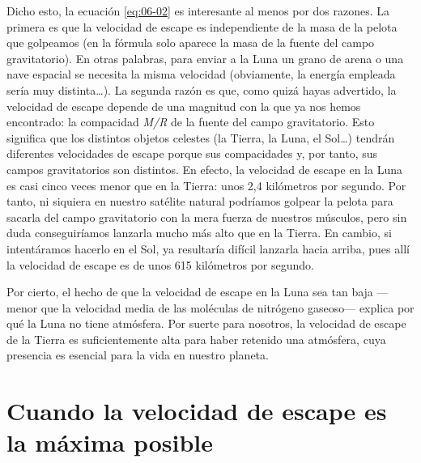Dicho esto, la ecuación \eqref{eq:06-02} es interesante al menos por dos razones. La primera es que la velocidad de escape es independiente de la masa de la pelota que golpeamos (en la fórmula solo aparece la masa de la fuente del campo gravitatorio). En otras palabras, para enviar a la Luna un grano de arena o una nave espacial se necesita la misma velocidad (obviamente, la energía empleada sería muy distinta…). La segunda razón es que, como quizá hayas advertido, la velocidad de escape depende de una magnitud con la que ya nos hemos encontrado: la compacidad \emph{M/R} de la fuente del campo gravitatorio. Esto significa que los distintos objetos celestes (la Tierra, la Luna, el Sol…) tendrán diferentes velocidades de escape porque sus compacidades y, por tanto, sus campos gravitatorios son distintos. En efecto, la velocidad de escape en la Luna es casi cinco veces menor que en la Tierra: unos 2,4 kilómetros por segundo. Por tanto, ni siquiera en nuestro satélite natural podríamos golpear la pelota para sacarla del campo gravitatorio con la mera fuerza de nuestros músculos, pero sin duda conseguiríamos lanzarla mucho más alto que en la Tierra. En cambio, si intentáramos hacerlo en el Sol, ya resultaría difícil lanzarla hacia arriba, pues allí la velocidad de escape es de unos 615 kilómetros por segundo.

Por cierto, el hecho de que la velocidad de escape en la Luna sea tan baja ---menor que la velocidad media de las moléculas de nitrógeno gaseoso--- explica por qué la Luna no tiene atmósfera. Por suerte para nosotros, la velocidad de escape de la Tierra es suficientemente alta para haber retenido una atmósfera, cuya presencia es esencial para la vida en nuestro planeta.

\section[La máxima velocidad de escape]{Cuando la velocidad de escape es la máxima posible}\label{sec:06-light}

